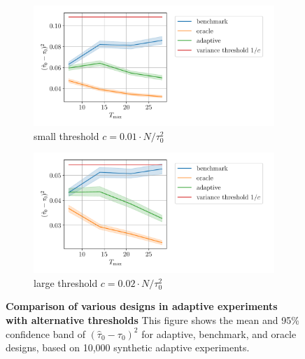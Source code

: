     \begin{figure}[h!]
    \centering
    \begin{subfigure}{0.5\textwidth}
		\centering
		\includegraphics[width=1\linewidth]{plots/empirical/flu/adaptive/flu_adaptive_comparison-10.pdf}
		\caption{small threshold $c = 0.01 \cdot N/\tau_0^2$}
	\end{subfigure}%
	\begin{subfigure}{0.5\textwidth}
		\centering
		\includegraphics[width=1\linewidth]{plots/empirical/flu/adaptive/flu_adaptive_comparison-20.pdf}
		\caption{large threshold $c = 0.02 \cdot N/\tau_0^2$}
	\end{subfigure}
	\smallskip
	\caption{\textbf{Comparison of various designs in adaptive experiments with alternative thresholds} This figure shows the mean and 95\% confidence band of $(\hat{\tau}_0 - \tau_0)^2$ for adaptive, benchmark, and oracle designs, based on 10,000 synthetic adaptive experiments. 
	}
	\label{fig:various-opt-design-supp}
\end{figure}







